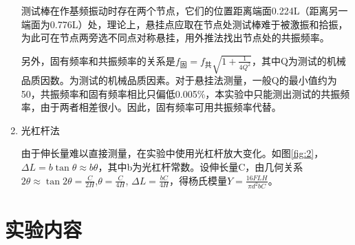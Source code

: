 \documentclass[11pt]{article}
\begin{document}
\begin{enumerate}
    \par \hspace*{2em}测试棒在作基频振动时存在两个节点，它们的位置距离端面0.224L（距离另一端面为0.776L）处，理论上，悬挂点应取在节点处测试棒难于被激振和拾振，为此可在节点两旁选不同点对称悬挂，用外推法找出节点处的共振频率。
    \par \hspace*{2em}另外，固有频率和共振频率的关系是$f_{\text{固}}=f_{\text{共}}\sqrt{1+\frac{1}{4Q^2}}$，其中Q为测试的机械品质因数。为测试的机械品质因素。对于悬挂法测量，一般Q的最小值约为50，共振频率和固有频率相比只偏低0.005\%，本实验中只能测出测试的共振频率，由于两者相差很小。因此，固有频率可用共振频率代替。
    \item 光杠杆法
    \par \hspace*{2em} 由于伸长量难以直接测量，在实验中使用光杠杆放大变化。如图\ref{fig:2}，$\Delta L=b\tan{\theta}\approx b\theta$，其中b为光杠杆常数。设伸长量C，由几何关系$2\theta\approx\tan{2\theta}=\frac{C}{2H}$,$\theta=\frac{C}{4H}$, $\Delta L=\frac{bC}{4H}$，得杨氏模量$Y=\frac{16FLH}{\pi d^2bC}$。 

\end{enumerate}


\section{实验内容}
\end{document}
